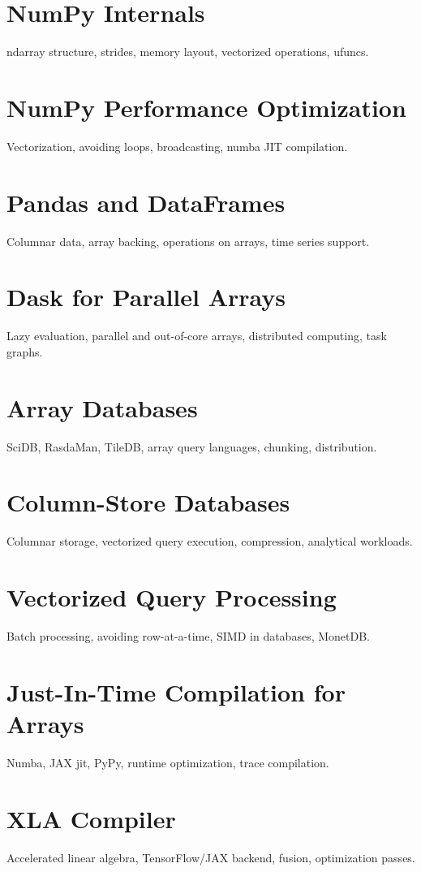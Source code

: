 \chapter{NumPy Internals}
ndarray structure, strides, memory layout, vectorized operations, ufuncs.

\chapter{NumPy Performance Optimization}
Vectorization, avoiding loops, broadcasting, numba JIT compilation.

\chapter{Pandas and DataFrames}
Columnar data, array backing, operations on arrays, time series support.

\chapter{Dask for Parallel Arrays}
Lazy evaluation, parallel and out-of-core arrays, distributed computing, task graphs.

\chapter{Array Databases}
SciDB, RasdaMan, TileDB, array query languages, chunking, distribution.

\chapter{Column-Store Databases}
Columnar storage, vectorized query execution, compression, analytical workloads.

\chapter{Vectorized Query Processing}
Batch processing, avoiding row-at-a-time, SIMD in databases, MonetDB.

\chapter{Just-In-Time Compilation for Arrays}
Numba, JAX jit, PyPy, runtime optimization, trace compilation.

\chapter{XLA Compiler}
Accelerated linear algebra, TensorFlow/JAX backend, fusion, optimization passes.

